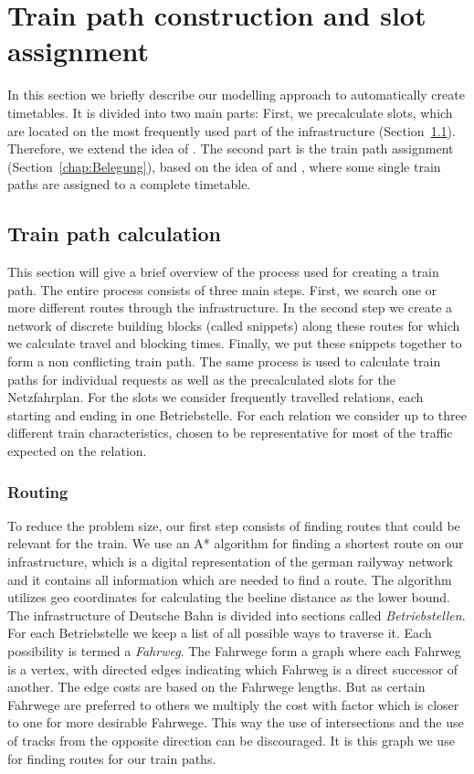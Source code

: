 \section{Train path construction and slot assignment}
\label{chap:methods}
%
In this section we briefly describe our modelling approach to automatically create timetables. It is divided into two main parts: First, we precalculate slots, which are located on the most frequently used part of the infrastructure (Section~\ref{chap:Konstruktion}). Therefore, we extend the idea of \cite{O:2009}. The second part is the train path assignment (Section~\ref{chap:Belegung}), based on the idea of \cite{N:1998, N:2015} and \cite{NO:2014}, where some single train paths are assigned to a complete timetable.


\subsection{Train path calculation}
\label{chap:Konstruktion}
%
This section will give a brief overview of the process used for creating a train path. The entire process consists of three main steps. First, we search one or more different routes through the infrastructure. In the second step we create a network of discrete building blocks (called snippets) along these routes for which we calculate travel and blocking times. Finally, we put these snippets together to form a non conflicting train path. The same process is used to calculate train paths for individual requests as well as the precalculated slots for the Netzfahrplan. For the slots we consider frequently travelled relations, each starting and ending in one Betriebstelle. For each relation we consider up to three different train characteristics, chosen to be representative for most of the traffic expected on the relation.


\subsubsection{Routing}
To reduce the problem size, our first step consists of finding routes that could be relevant for the train. We use an A* algorithm for finding a shortest route on our infrastructure, which is a digital representation of the german railyway network and it contains all information which are needed to find a route. The algorithm utilizes geo coordinates for calculating the beeline distance as the lower bound. The infrastructure of Deutsche Bahn is divided into sections called \emph{Betriebstellen}.
For each Betriebstelle we keep a list of all possible ways to traverse it. Each possibility is termed a \emph{Fahrweg}. The Fahrwege form a graph where each Fahrweg is a vertex, with directed edges indicating which Fahrweg is a direct successor of another. The edge costs are based on the Fahrwege lengths.
But as certain Fahrwege are preferred to others we multiply the cost with factor which is closer to one for more desirable Fahrwege. This way the use of intersections and the use of tracks from the opposite direction can be discouraged. It is this graph we use for finding routes for our train paths.

